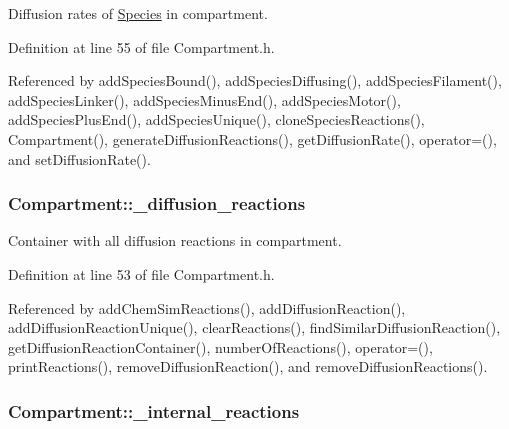 Diffusion rates of \hyperlink{classSpecies}{Species} in compartment. 



Definition at line 55 of file Compartment.\+h.



Referenced by add\+Species\+Bound(), add\+Species\+Diffusing(), add\+Species\+Filament(), add\+Species\+Linker(), add\+Species\+Minus\+End(), add\+Species\+Motor(), add\+Species\+Plus\+End(), add\+Species\+Unique(), clone\+Species\+Reactions(), Compartment(), generate\+Diffusion\+Reactions(), get\+Diffusion\+Rate(), operator=(), and set\+Diffusion\+Rate().

\hypertarget{classCompartment_a65651faf3e83b092235afdba261cf820}{
\subsubsection[{\+\_\+diffusion\+\_\+reactions}]{ Compartment\+::\+\_\+diffusion\+\_\+reactions\hspace{0.3cm}{\ttfamily [protected]}}}\label{classCompartment_a65651faf3e83b092235afdba261cf820}


Container with all diffusion reactions in compartment. 



Definition at line 53 of file Compartment.\+h.



Referenced by add\+Chem\+Sim\+Reactions(), add\+Diffusion\+Reaction(), add\+Diffusion\+Reaction\+Unique(), clear\+Reactions(), find\+Similar\+Diffusion\+Reaction(), get\+Diffusion\+Reaction\+Container(), number\+Of\+Reactions(), operator=(), print\+Reactions(), remove\+Diffusion\+Reaction(), and remove\+Diffusion\+Reactions().

\hypertarget{classCompartment_a76ec81e3474bacae837cce0081a03039}{
\subsubsection[{\+\_\+internal\+\_\+reactions}]{ Compartment\+::\+\_\+internal\+\_\+reactions\hspace{0.3cm}{\ttfamily [protected]}}}\label{classCompartment_a76ec81e3474bacae837cce0081a03039}


